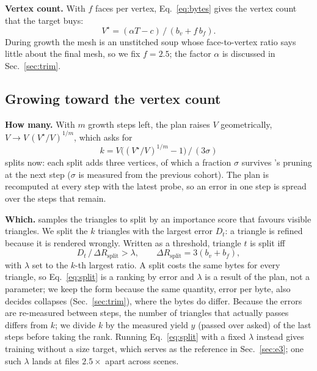 \noindent\textbf{Vertex count.} With $f$ faces per vertex, Eq.~\eqref{eq:bytes} gives the vertex count that the target buys:
\begin{equation}
V^\star = (\alpha T - c)\,/\,(b_v + f\, b_f).
\label{eq:vstar}
\end{equation}
During growth the mesh is an unstitched soup whose face-to-vertex ratio says little about the final mesh, so we fix $f = 2.5$; the factor $\alpha$ is discussed in Sec.~\ref{sec:trim}.

\subsection{Growing toward the vertex count}
\label{sec:growth}
\noindent\textbf{How many.} With $m$ growth steps left, the plan raises $V$ geometrically, $V \rightarrow V\,(V^\star/V)^{1/m}$, which asks for
\begin{equation}
k = V\big((V^\star/V)^{1/m}-1\big)\,/\,(3\sigma)
\label{eq:k}
\end{equation}
splits now: each split adds three vertices, of which a fraction $\sigma$ survives \MS's pruning at the next step ($\sigma$ is measured from the previous cohort). The plan is recomputed at every step with the latest probe, so an error in one step is spread over the steps that remain.

\noindent\textbf{Which.} \MS samples the triangles to split by an importance score that favours visible triangles. We split the $k$ triangles with the largest error $D_t$: a triangle is refined because it is rendered wrongly. Written as a threshold, triangle $t$ is split iff
\begin{equation}
D_t \,/\, \Delta R_{\mathrm{split}} > \lambda ,\qquad \Delta R_{\mathrm{split}} = 3(b_v + b_f),
\label{eq:split}
\end{equation}
with $\lambda$ set to the $k$-th largest ratio. A split costs the same bytes for every triangle, so Eq.~\eqref{eq:split} is a ranking by error and $\lambda$ is a result of the plan, not a parameter; we keep the form because the same quantity, error per byte, also decides collapses (Sec.~\ref{sec:trim}), where the bytes do differ. Because the errors are re-measured between steps, the number of triangles that actually passes differs from $k$; we divide $k$ by the measured yield $y$ (passed over asked) of the last steps before taking the rank. Running Eq.~\eqref{eq:split} with a fixed $\lambda$ instead gives training without a size target, which serves as the reference in Sec.~\ref{sec:e3}; one such $\lambda$ lands at files $2.5\times$ apart across scenes.

